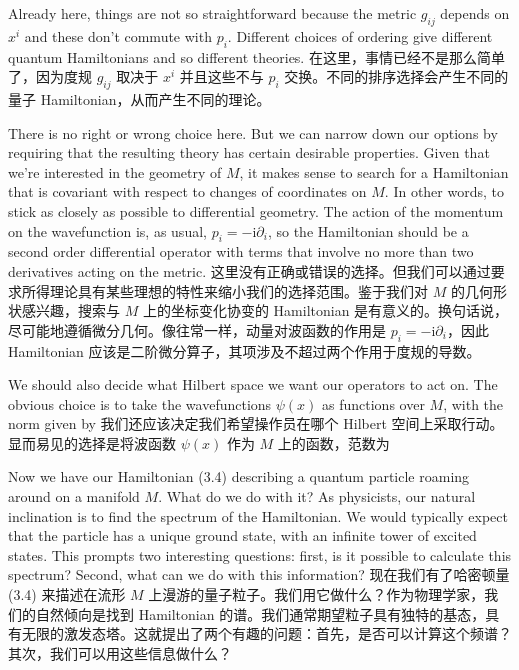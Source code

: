 \documentclass{article}
\newcommand{\rmi}{\mathrm{i}}
\begin{document}
\begin{paracol}{2}
Already here, things are not so straightforward because the metric $g_{ij}$ depends on $x^i$ and these don’t commute with $p_i$. Diﬀerent choices of ordering give diﬀerent quantum Hamiltonians and so diﬀerent theories.
\switchcolumn
在这里，事情已经不是那么简单了，因为度规 $g_{ij}$ 取决于 $x^i$ 并且这些不与 $p_i$ 交换。不同的排序选择会产生不同的量子 Hamiltonian，从而产生不同的理论。
\switchcolumn*

There is no right or wrong choice here. But we can narrow down our options by requiring that the resulting theory has certain desirable properties. Given that we’re interested in the geometry of $M$, it makes sense to search for a Hamiltonian that is covariant with respect to changes of coordinates on $M$. In other words, to stick as closely as possible to diﬀerential geometry. The action of the momentum on the wavefunction is, as usual, $p_i = - \rmi \partial_i$, so the Hamiltonian should be a second order diﬀerential operator with terms that involve no more than two derivatives acting on the metric.
\switchcolumn
这里没有正确或错误的选择。但我们可以通过要求所得理论具有某些理想的特性来缩小我们的选择范围。鉴于我们对 $M$ 的几何形状感兴趣，搜索与 $M$ 上的坐标变化协变的 Hamiltonian 是有意义的。换句话说，尽可能地遵循微分几何。像往常一样，动量对波函数的作用是 $p_i = - \rmi \partial_i$，因此 Hamiltonian 应该是二阶微分算子，其项涉及不超过两个作用于度规的导数。
\switchcolumn*

We should also decide what Hilbert space we want our operators to act on. The obvious choice is to take the wavefunctions $\psi(x)$ as functions over $M$, with the norm given by
\switchcolumn
我们还应该决定我们希望操作员在哪个 Hilbert 空间上采取行动。显而易见的选择是将波函数 $\psi(x)$ 作为 $M$ 上的函数，范数为
\switchcolumn*

Now we have our Hamiltonian (3.4) describing a quantum particle roaming around on a manifold $M$. What do we do with it? As physicists, our natural inclination is to find the spectrum of the Hamiltonian. We would typically expect that the particle has a unique ground state, with an infinite tower of excited states. This prompts two interesting questions: first, is it possible to calculate this spectrum? Second, what can we do with this information?
\switchcolumn
现在我们有了哈密顿量 (3.4) 来描述在流形 $M$ 上漫游的量子粒子。我们用它做什么？作为物理学家，我们的自然倾向是找到 Hamiltonian 的谱。我们通常期望粒子具有独特的基态，具有无限的激发态塔。这就提出了两个有趣的问题：首先，是否可以计算这个频谱？其次，我们可以用这些信息做什么？
\switchcolumn*


\end{paracol}
\end{document}
